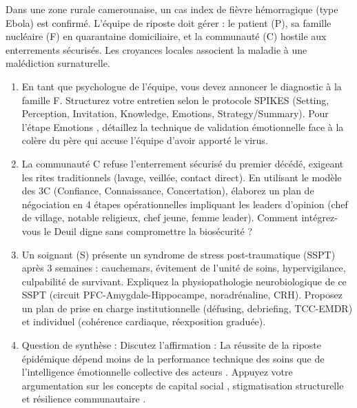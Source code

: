 \documentclass[11pt]{article}
\begin{document}
\begin{exercice}
Dans une zone rurale camerounaise, un cas index de fièvre hémorragique (type Ebola) est confirmé. L'équipe de riposte doit gérer : le patient (P), sa famille nucléaire (F) en quarantaine domiciliaire, et la communauté (C) hostile aux enterrements sécurisés. Les croyances locales associent la maladie à une malédiction surnaturelle.

\begin{enumerate}
\item En tant que psychologue de l'équipe, vous devez annoncer le diagnostic à la famille F. Structurez votre entretien selon le protocole SPIKES (Setting, Perception, Invitation, Knowledge, Emotions, Strategy/Summary). Pour l'étape \og Emotions \fg, détaillez la technique de \og validation émotionnelle \fg face à la colère du père qui accuse l'équipe d'avoir apporté le virus.
\item La communauté C refuse l'enterrement sécurisé du premier décédé, exigeant les rites traditionnels (lavage, veillée, contact direct). En utilisant le modèle des \og 3C \fg (Confiance, Connaissance, Concertation), élaborez un plan de négociation en 4 étapes opérationnelles impliquant les leaders d'opinion (chef de village, notable religieux, chef jeune, femme leader). Comment intégrez-vous le \og Deuil digne \fg sans compromettre la biosécurité ?
\item Un soignant (S) présente un syndrome de stress post-traumatique (SSPT) après 3 semaines : cauchemars, évitement de l'unité de soins, hypervigilance, culpabilité de survivant. Expliquez la physiopathologie neurobiologique de ce SSPT (circuit PFC-Amygdale-Hippocampe, noradrénaline, CRH). Proposez un plan de prise en charge institutionnelle (défusing, debriefing, TCC-EMDR) et individuel (cohérence cardiaque, réexposition graduée).
\item Question de synthèse : Discutez l'affirmation : \og La réussite de la riposte épidémique dépend moins de la performance technique des soins que de l'intelligence émotionnelle collective des acteurs \fg. Appuyez votre argumentation sur les concepts de \og capital social \fg, \og stigmatisation structurelle \fg et \og résilience communautaire \fg.
\end{enumerate}
\end{exercice}
\end{document}
